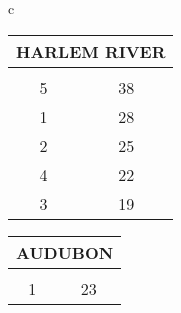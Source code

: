 \begin{table}[H]
        \small
        \begin{tabular}{c}
                            
                        \begin{tabular}{cc}
                        \multicolumn{2}{l}{HARLEM RIVER}                                                                                                                                   \\ \hline
                        \rowcolor{\ccorange} 
                        \multicolumn{1}{|c|}{\cellcolor{\ccorange}{\color[HTML]{FFFFFF} Building}} & \multicolumn{1}{c|}{\cellcolor{\ccorange}{\color[HTML]{FFFFFF} Total Repairs}} \\ \hline
                        \multicolumn{1}{|c|}{5}                                                        & \multicolumn{1}{c|}{38}                                                             \\ \hline
\multicolumn{1}{|c|}{1}                                                        & \multicolumn{1}{c|}{28}                                                             \\ \hline
\multicolumn{1}{|c|}{2}                                                        & \multicolumn{1}{c|}{25}                                                             \\ \hline
\multicolumn{1}{|c|}{4}                                                        & \multicolumn{1}{c|}{22}                                                             \\ \hline
\multicolumn{1}{|c|}{3}                                                        & \multicolumn{1}{c|}{19}                                                             \\ \hline
\end{tabular}
                        \begin{tabular}{cc}
                        \multicolumn{2}{l}{AUDUBON}                                                                                                                                   \\ \hline
                        \rowcolor{\ccorange} 
                        \multicolumn{1}{|c|}{\cellcolor{\ccorange}{\color[HTML]{FFFFFF} Building}} & \multicolumn{1}{c|}{\cellcolor{\ccorange}{\color[HTML]{FFFFFF} Total Repairs}} \\ \hline
                        \multicolumn{1}{|c|}{1}                                                        & \multicolumn{1}{c|}{23}                                                             \\ \hline

\end{tabular}
\end{tabular}
\end{table}
